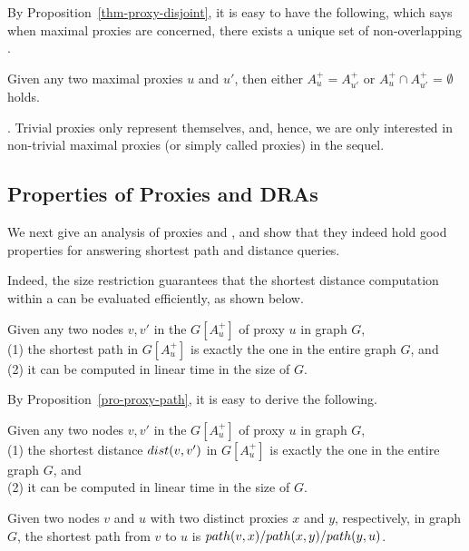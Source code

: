 By Proposition~\ref{thm-proxy-disjoint}, it is easy to have the following, which says when maximal proxies are concerned, there exists a unique set of non-overlapping \dras.

\begin{cor}
\label{cor-proxy-disjoint} Given any two maximal proxies $u$ and $u'$, then either $A^+_{u} = A^+_{u'}$ or $A^+_{u}\cap A^+_{u'}$ = $\emptyset$ holds.
\end{cor}


\vspace{-1ex}
. Trivial proxies only represent themselves, and, hence, we are only interested in non-trivial maximal proxies (or simply called proxies) in the sequel.


\subsection{Properties of Proxies and DRAs}
\label{subsec-proxy-properties}

We next give an analysis of proxies and \dras, and show that they indeed hold good properties for answering shortest path and distance queries.
%



Indeed, the size restriction guarantees that the shortest distance computation within a \dra can be evaluated efficiently,
as shown below.


\begin{prop}
\label{pro-proxy-path} Given any two nodes $v, v'$ in the \dra $G[A^+_u]$ of proxy $u$ in graph $G$, \\
(1) the shortest path in $G[A^+_u]$ is exactly the one in the entire graph $G$, and\\
(2) it can be computed in linear time in the size of $G$.
\end{prop}


By Proposition~\ref{pro-proxy-path}, it is easy to derive the following.

\begin{cor}
\label{cor-proxy-distance} Given any two nodes $v, v'$ in the \dra $G[A^+_u]$ of proxy $u$ in graph $G$, \\
(1) the shortest distance $\dist(v, v')$ in $G[A^+_u]$ is exactly the one in the entire graph $G$, and\\
(2) it can be computed in linear time in the size of $G$.
\end{cor}


\begin{prop}
\label{pro-proxy-path-global} Given two nodes $v$ and $u$ with two distinct proxies $x$ and $y$, respectively, in graph $G$, the shortest path from $v$ to $u$ is $\path(v, x)/\path(x, y)/\path(y, u)$.
\end{prop}


